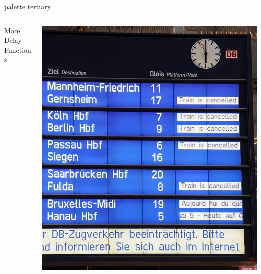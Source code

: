 \documentclass[aspectratio=169]{beamer}
\begin{document}
\begin{frame}[plain]
  \begin{beamercolorbox}[sep=0.1px,center,wd=\paperwidth,ht=\paperheight]{palette tertiary}
    \begin{columns}
      \begin{column}{0.55\textwidth}
        \Huge\centering More Delay\\ Functions
      \end{column}
      \begin{column}{0.45\textwidth}
        \includegraphics[height=\paperheight]{db.jpg}
      \end{column}
    \end{columns}
  \end{beamercolorbox}
\end{frame}

\end{document}
